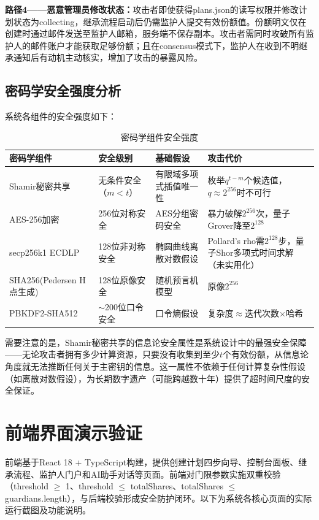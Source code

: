 \documentclass[UTF8,a4paper,zihao=-4,openany]{ctexrep}
\begin{document}
\textbf{路径4——恶意管理员修改状态：}攻击者即使获得plans.json的读写权限并修改计划状态为collecting，继承流程启动后仍需监护人提交有效份额值。份额明文仅在创建时通过邮件发送至监护人邮箱，服务端不保存副本。攻击者需同时攻破所有监护人的邮件账户才能获取足够份额；且在consensus模式下，监护人在收到不明继承通知后有动机主动核实，增加了攻击的暴露风险。

\subsection{密码学安全强度分析}

系统各组件的安全强度如下：

\begin{table}[H]
\centering
\small
\caption{密码学组件安全强度}
\setlength{\extrarowheight}{3pt}
\begin{tabularx}{\textwidth}{p{3cm}p{2.2cm}p{2.8cm}X}
\toprule
密码学组件 & 安全级别 & 基础假设 & 攻击代价\\
\midrule
Shamir秘密共享 & 无条件安全（$m<t$） & 有限域多项式插值唯一性 & 枚举$q^{t-m}$个候选值，$q\approx 2^{256}$时不可行\\
AES-256加密 & 256位对称安全 & AES分组密码安全 & 暴力破解$2^{256}$次，量子Grover降至$2^{128}$\\
secp256k1 ECDLP & 128位非对称安全 & 椭圆曲线离散对数假设 & Pollard's rho需$2^{128}$步，量子Shor多项式时间求解（未实用化）\\
SHA256(Pedersen H点生成) & 128位原像安全 & 随机预言机模型 & 原像$2^{256}$\\
PBKDF2-SHA512 & $\sim$200位口令安全 & 口令熵假设 & 复杂度$\approx$迭代次数$\times$哈希\\
\bottomrule
\end{tabularx}
\end{table}

需要注意的是，Shamir秘密共享的信息论安全属性是系统设计中的最强安全保障——无论攻击者拥有多少计算资源，只要没有收集到至少$t$个有效份额，从信息论角度就无法推断任何关于主密钥的信息。这一属性不依赖于任何计算复杂性假设（如离散对数假设），为长期数字遗产（可能跨越数十年）提供了超时间尺度的安全保证。

\section{前端界面演示验证}

前端基于React 18 + TypeScript构建，提供创建计划四步向导、控制台面板、继承流程、监护人门户和AI助手对话等页面。前端对门限参数实施双重校验（threshold $\ge$ 1、threshold $\le$ totalShares、totalShares $\le$ guardians.length），与后端校验形成安全防护闭环。以下为系统各核心页面的实际运行截图及功能说明。
\end{document}
